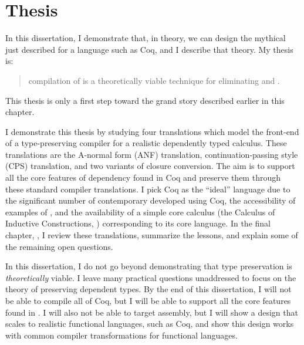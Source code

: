 \section{Thesis}
In this dissertation, I demonstrate that, in theory, we can design the mythical
 just described for a  language such as
Coq, and I describe that theory.
My thesis is:
\begin{quote}
   compilation of  is a
  theoretically viable technique for eliminating 
  and .
\end{quote}
This thesis is only a first step toward the grand story described earlier in
this chapter.

I demonstrate this thesis by studying four translations which model the
front-end of a type-preserving compiler for a realistic dependently typed
calculus.
These translations are the A-normal form (ANF) translation, continuation-passing
style (CPS) translation, and two variants of closure conversion.
The aim is to support all the core features of dependency found in Coq and
preserve them through these standard compiler translations.
I pick Coq as the ``ideal''  language due to the
significant number of contemporary  developed using Coq,
the accessibility of examples of , and the availability of
a simple core calculus (the Calculus of Inductive Constructions, )
corresponding to its core language.
In the final chapter, , I review these translations,
summarize the lessons, and explain some of the remaining open questions.

In this dissertation, I do not go beyond demonstrating that type preservation is
\emph{theoretically} viable.
I leave many practical questions unaddressed to focus on the theory of
preserving dependent types.
By the end of this dissertation, I will not be able to compile all of Coq, but I
will be able to support all the core  features found in
.
I will also not be able to target assembly, but I will show a design that scales
to realistic  functional languages, such as Coq, and
show this design works with common compiler transformations for functional
languages.

